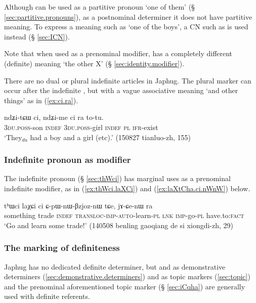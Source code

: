 Although  can be used as a partitive pronoun `one of them' (§ \ref{sec:partitive.pronouns}), as a postnominal determiner it does not have partitive meaning. To express a meaning such as `one of the boys', a CN such as  is used instead (§ \ref{sec:ICN}). 

Note that when used as a prenominal modifier,  has a completely different (definite) meaning `the other X' (§ \ref{sec:identity.modifier}). 

There are no dual or plural indefinite articles in Japhug. The plural marker  can occur after the indefinite , but with a vague associative meaning `and other things' as in (\ref{ex:ci.ra}).

\begin{exe}
\ex \label{ex:ci.ra}
 \gll  ndʑi-tɕɯ ci, ndʑi-me ci ra to-tu. \\
 \textsc{3du}.\textsc{poss}-son \textsc{indef}  \textsc{3du}.\textsc{poss}-girl \textsc{indef} \textsc{pl} \textsc{ifr}-exist \\
 \glt  `They$_{du}$ had a boy and a girl (etc).' (150827 tianluo-zh, 155)
\end{exe}

\subsubsection{Indefinite pronoun as modifier} \label{sec:indefinite}
The indefinite pronoun  (§ \ref{sec:thWci}) has marginal uses as a prenominal indefinite modifier, as in  (\ref{ex:thWci.laXCi}) and (\ref{ex:laXtCha.ci.nWnW}) below. 

\begin{exe}
\ex \label{ex:thWci.laXCi}
\gll   tʰɯci laχɕi ci ɕ-pɯ-nɯ-βzjoz-nɯ tɕe, jɤ-ɕe-nɯ ra \\
something trade \textsc{indef} \textsc{transloc-imp-auto}-learn-\textsc{pl} \textsc{lnk} \textsc{imp}-go-\textsc{pl} have.to:\textsc{fact} \\
\glt `Go and learn some trade!' (140508 benling gaoqiang de si xiongdi-zh, 29)
 \end{exe}
 

\subsubsection{The marking of definiteness} \label{sec:definiteness}
Japhug has no dedicated definite determiner, but   and   as demonstrative determiners (\ref{sec:demonstrative.determiners}) and as topic markers (\ref{sec:topic}) and the prenominal aforementioned topic marker  (§ \ref{sec:iCqha}) are generally used with definite referents.  

